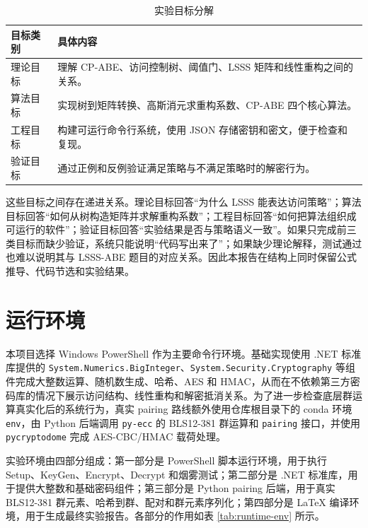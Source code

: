 \begin{table}[H]
\centering
\caption{实验目标分解}
\begin{tabular}{p{} p{}}
\toprule
目标类别 & 具体内容 \\
\midrule
理论目标 & 理解 CP-ABE、访问控制树、阈值门、LSSS 矩阵和线性重构之间的关系。\\
算法目标 & 实现树到矩阵转换、高斯消元求重构系数、CP-ABE 四个核心算法。\\
工程目标 & 构建可运行命令行系统，使用 JSON 存储密钥和密文，便于检查和复现。\\
验证目标 & 通过正例和反例验证满足策略与不满足策略时的解密行为。\\
\bottomrule
\end{tabular}
\end{table}

这些目标之间存在递进关系。理论目标回答“为什么 LSSS 能表达访问策略”；算法目标回答“如何从树构造矩阵并求解重构系数”；工程目标回答“如何把算法组织成可运行的软件”；验证目标回答“实验结果是否与策略语义一致”。如果只完成前三类目标而缺少验证，系统只能说明“代码写出来了”；如果缺少理论解释，测试通过也难以说明其与 LSSS-ABE 题目的对应关系。因此本报告在结构上同时保留公式推导、代码节选和实验结果。

\section{运行环境}

本项目选择 Windows PowerShell 作为主要命令行环境。基础实现使用 .NET 标准库提供的 \verb|System.Numerics.BigInteger|、\verb|System.Security.Cryptography| 等组件完成大整数运算、随机数生成、哈希、AES 和 HMAC，从而在不依赖第三方密码库的情况下展示访问结构、线性重构和解密抵消关系。为了进一步检查底层群运算真实化后的系统行为，真实 pairing 路线额外使用仓库根目录下的 conda 环境 \verb|env|，由 Python 后端调用 \verb|py-ecc| 的 BLS12-381 群运算和 \verb|pairing| 接口，并使用 \verb|pycryptodome| 完成 AES-CBC/HMAC 载荷处理。

实验环境由四部分组成：第一部分是 PowerShell 脚本运行环境，用于执行 Setup、KeyGen、Encrypt、Decrypt 和烟雾测试；第二部分是 .NET 标准库，用于提供大整数和基础密码组件；第三部分是 Python pairing 后端，用于真实 BLS12-381 群元素、哈希到群、配对和群元素序列化；第四部分是 LaTeX 编译环境，用于生成最终实验报告。各部分的作用如表 \ref{tab:runtime-env} 所示。

